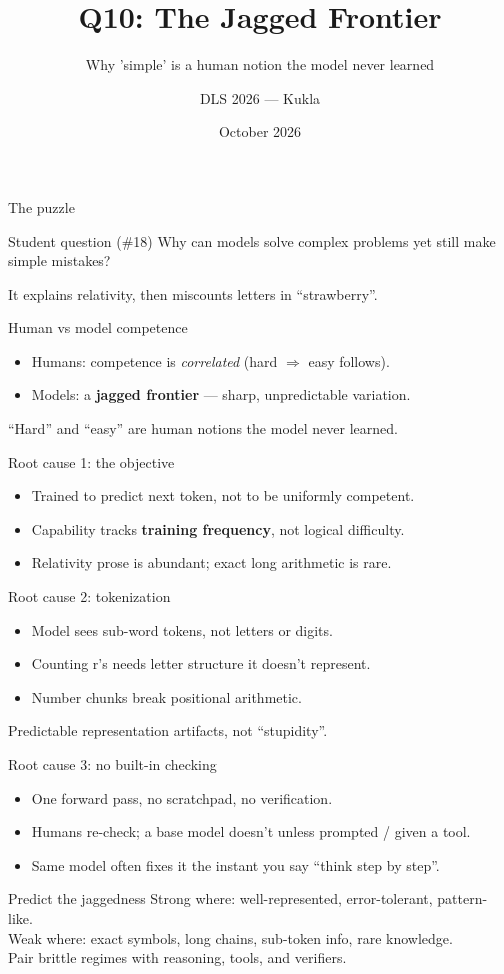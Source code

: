 \documentclass[aspectratio=169,10pt]{beamer}
\title{Q10: The Jagged Frontier}
\subtitle{Why 'simple' is a human notion the model never learned}
\author{DLS 2026 --- Kukla}
\date{October 2026}
\begin{document}
\maketitle

\begin{frame}{The puzzle}
\begin{block}{Student question (\#18)}
Why can models solve complex problems yet still make simple mistakes?
\end{block}
It explains relativity, then miscounts letters in ``strawberry''.
\end{frame}
\begin{frame}{Human vs model competence}
\begin{itemize}
\item Humans: competence is \emph{correlated} (hard $\Rightarrow$ easy follows).
\item Models: a \textbf{jagged frontier} --- sharp, unpredictable variation.
\end{itemize}
\alert{``Hard'' and ``easy'' are human notions the model never learned.}
\end{frame}
\begin{frame}{Root cause 1: the objective}
\begin{itemize}
\item Trained to predict next token, not to be uniformly competent.
\item Capability tracks \textbf{training frequency}, not logical difficulty.
\item Relativity prose is abundant; exact long arithmetic is rare.
\end{itemize}
\end{frame}
\begin{frame}{Root cause 2: tokenization}
\begin{itemize}
\item Model sees sub-word tokens, not letters or digits.
\item Counting r's needs letter structure it doesn't represent.
\item Number chunks break positional arithmetic.
\end{itemize}
\alert{Predictable representation artifacts, not ``stupidity''.}
\end{frame}
\begin{frame}{Root cause 3: no built-in checking}
\begin{itemize}
\item One forward pass, no scratchpad, no verification.
\item Humans re-check; a base model doesn't unless prompted / given a tool.
\item Same model often fixes it the instant you say ``think step by step''.
\end{itemize}
\end{frame}
\begin{frame}{Predict the jaggedness}
Strong where: well-represented, error-tolerant, pattern-like.\\
Weak where: exact symbols, long chains, sub-token info, rare knowledge.\\[1em]
\alert{Pair brittle regimes with reasoning, tools, and verifiers.}
\end{frame}
\end{document}
